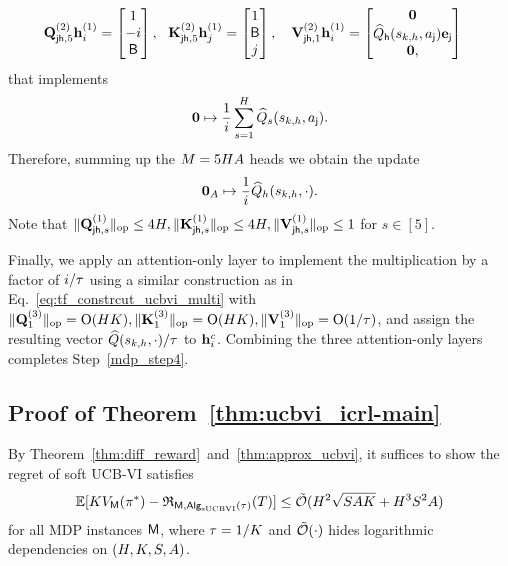 \begin{align*}
  & {\mathbf Q}_{{\mathsf{j}}{\mathsf{h}},5}^{(2)}{\mathbf h}_i^{(1)} =\begin{bmatrix}
       1\\-i\\
       {\mathsf{B}}
   \end{bmatrix},~~ {\mathbf K}_{{\mathsf{j}}{\mathsf{h}},5}^{(2)}{\mathbf h}_j^{(1)} =\begin{bmatrix}
    1 \\{\mathsf{B}}\\ j
   \end{bmatrix},~~~
   {\mathbf V}_{{\mathsf{j}}{\mathsf{h}},1}^{(2)}{\mathbf h}_i^{(1)} =\begin{bmatrix}
       {\mathbf 0} \\  {\widehat{{Q}}}_{\mathsf{h}}({s}_{k,h},{a}_{\mathsf{j}}){\mathbf e}_{{\mathsf{j}}}\\
       {\mathbf 0},
   \end{bmatrix}
\end{align*} that implements
\begin{align*}
    {\mathbf 0}\mapsto \frac{1}{i}\sum_{s=1}^{{H}}{{\widehat{{Q}}}_{s}({s}_{k,h},{a}_{\mathsf{j}})}.
\end{align*}
Therefore, summing up the ${M}=5{H}{A}$ heads we obtain the update
\begin{align*}
  {\mathbf 0}_{{A}}\mapsto \frac{1}{i}{\widehat{{Q}}}_{h}({s}_{k,h},\cdot).
\end{align*}
Note that $\|{{\mathbf Q}_{{\mathsf{j}}{\mathsf{h}},s}^{(1)}}\|_{\mathrm{op}}\leq4{H},\|{{\mathbf K}_{{\mathsf{j}}{\mathsf{h}},s}^{(1)}}\|_{\mathrm{op}}\leq4{H},\|{{\mathbf V}_{{\mathsf{j}}{\mathsf{h}},s}^{(1)}}\|_{\mathrm{op}}\leq1$ for $s\in[5]$.

Finally, we apply an attention-only layer to implement the multiplication by a factor of $i/{\tau}$ using a similar construction as in Eq.~\eqref{eq:tf_constrcut_ucbvi_multi} with $\|{{\mathbf Q}_1^{(3)}}\|_{\mathrm{op}}={\mathrm{O}}({H}{K}),\|{{\mathbf K}_1^{(3)}}\|_{\mathrm{op}}={\mathrm{O}}({H}{K}),\|{{\mathbf V}_1^{(3)}}\|_{\mathrm{op}}={\mathrm{O}}(1/{\tau})$, and assign the resulting vector ${\widehat{{Q}}}({s}_{k,h},\cdot)/{\tau}$ to ${\mathbf h}_i^{c}$.
Combining the three attention-only layers completes Step~\ref{mdp_step4}.





















\subsection{Proof of Theorem~\ref{thm:ucbvi_icrl-main}}\label{sec:pf_thm:ucbvi_icrl-main}
By Theorem~\ref{thm:diff_reward}~and~\ref{thm:approx_ucbvi}, it suffices to show the regret of soft UCB-VI satisfies
\begin{align*}
\mathbb{E}[{K}{{V}}_{\mathsf{M}}({\pi}^*)-{\mathfrak{R}}_{{\mathsf{M}},{\mathsf{Alg}}_{\mathrm{sUCBVI}}({\tau})}({T})]\leq {\tilde{\mathcal O}} ({H}^2\sqrt{{S}{A}{K}}+{H}^3{S}^2{A})
\end{align*} for all MDP instances ${\mathsf{M}}$, where ${\tau}=1/{K}$ and ${\tilde{\mathcal O}}(\cdot)$ hides logarithmic dependencies on $({H},{K},{S},{A})$.


